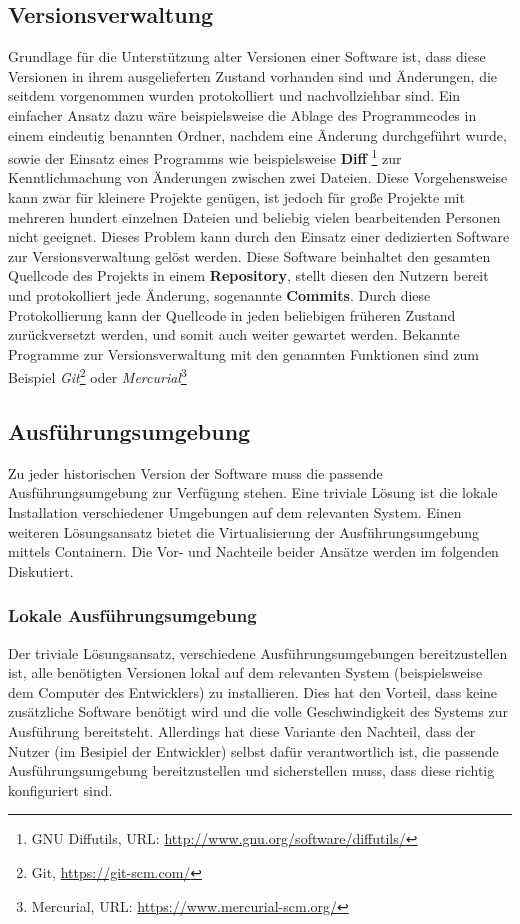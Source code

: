     \subsection{Versionsverwaltung}
        Grundlage für die Unterstützung alter Versionen einer Software ist, dass diese Versionen in ihrem ausgelieferten Zustand vorhanden sind und Änderungen, die seitdem
        vorgenommen wurden protokolliert und nachvollziehbar sind. Ein einfacher Ansatz dazu wäre beispielsweise die Ablage des Programmcodes in einem eindeutig benannten 
        Ordner, nachdem eine Änderung durchgeführt wurde, sowie der Einsatz eines Programms wie beispielsweise \textbf{Diff} \footnote{GNU Diffutils, URL: \url{http://www.gnu.org/software/diffutils/}} 
        zur Kenntlichmachung von Änderungen zwischen zwei Dateien. Diese Vorgehensweise kann zwar für kleinere Projekte genügen, ist jedoch für große Projekte mit mehreren 
        hundert einzelnen Dateien und beliebig vielen bearbeitenden Personen nicht geeignet. Dieses Problem kann durch den Einsatz einer dedizierten Software zur 
        Versionsverwaltung gelöst werden. Diese Software beinhaltet den gesamten Quellcode des Projekts in einem \textbf{Repository}, stellt diesen den Nutzern bereit 
        und protokolliert jede Änderung, sogenannte \textbf{Commits}. Durch diese Protokollierung kann der Quellcode in jeden beliebigen früheren Zustand zurückversetzt 
        werden, und somit auch weiter gewartet werden. Bekannte Programme zur Versionsverwaltung mit den genannten Funktionen sind zum Beispiel 
        \textit{Git}\footnote{Git, \url{https://git-scm.com/}} oder \textit{Mercurial}\footnote{Mercurial, URL: \url{https://www.mercurial-scm.org/}}
    \subsection{Ausführungsumgebung}\label{execution}
        Zu jeder historischen Version der Software muss die passende Ausführungsumgebung zur Verfügung stehen. Eine triviale 
        Lösung ist die lokale Installation verschiedener Umgebungen auf dem relevanten System. Einen weiteren Lösungsansatz 
        bietet die Virtualisierung der Ausführungsumgebung mittels Containern. Die Vor- und Nachteile beider Ansätze 
        werden im folgenden Diskutiert.
        \subsubsection{Lokale Ausführungsumgebung}
        Der triviale Lösungsansatz, verschiedene Ausführungsumgebungen bereitzustellen ist, alle benötigten Versionen lokal 
        auf dem relevanten System (beispielsweise dem Computer des Entwicklers) zu installieren. Dies hat den Vorteil, dass 
        keine zusätzliche Software benötigt wird und die volle Geschwindigkeit des Systems zur Ausführung bereitsteht. 
        Allerdings hat diese Variante den Nachteil, dass der Nutzer (im Besipiel der Entwickler) selbst dafür verantwortlich ist, 
        die passende Ausführungsumgebung bereitzustellen und sicherstellen muss, dass diese richtig konfiguriert sind. 

